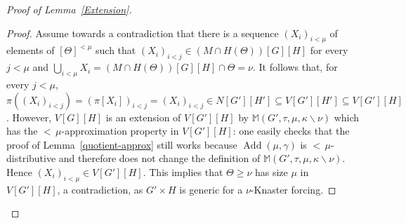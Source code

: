 \documentclass[a4paper]{amsart}
\theoremstyle{definition}
\theoremstyle{remark}
\theoremstyle{plain}
\newtheorem{mysclai}[mydef]{Subclaim}
\numberwithin{mydef}{section}
\DeclareMathOperator{\Add}{Add}
\newcommand{\dM}{\mathbb{M}}
\newcommand{\dP}{\mathbb{P}}
\begin{document}
\begin{proof}[Proof of Lemma~\ref{Extension}]
		\begin{proof}
			Assume towards a contradiction that there is a sequence $(X_i)_{i<\mu}$ of elements of $[\Theta]^{<\mu}$ such that $(X_i)_{i<j}\in (M\cap H(\Theta))[G][H]$ for every $j<\mu$ and $\bigcup_{i<\mu}X_i=(M\cap H(\Theta))[G][H]\cap\Theta=\nu$. It follows that, for every $j<\mu$, $\pi((X_i)_{i<j})=(\pi[X_i])_{i<j}=(X_i)_{i<j}\in N[G'][H']\subseteq V[G'][H']\subseteq V[G'][H]$. However, $V[G][H]$ is an extension of $V[G'][H]$ by $\dM(G',\tau,\mu,\kappa\smallsetminus\nu)$ which has the ${<}\,\mu$-approximation property in $V[G'][H]$: one easily checks that the proof of Lemma~\autoref{quotient-approx} still works because $\Add(\mu,\gamma)$ is ${<}\,\mu$-distributive and therefore does not change the definition of $\dM(G',\tau,\mu,\kappa\smallsetminus\nu)$. Hence $(X_i)_{i<\mu}\in V[G'][H]$. This implies that $\Theta\geq\nu$ has size $\mu$ in $V[G'][H]$, a contradiction, as $G'\times H$ is generic for a $\nu$-Knaster forcing. 
		\end{proof}			
		

		
			
			
%				
%				
%				
%				
%
%
%				
	

\end{proof}
\end{document}
